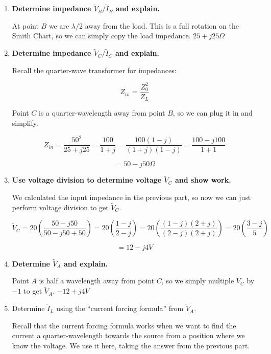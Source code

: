 \documentclass{article}
\begin{document}
\begin{enumerate}
    \item \textbf{Determine impedance $\tilde{V}_B/\tilde{I}_B$ and explain.}

    At point $B$ we are $\lambda/2$ away from the load. This is a full rotation on the Smith Chart, so we can simply copy the load impedance. $\boxed{25 + j25 \Omega}$

    \vfill
    
    \item \textbf{Determine impedance $\tilde{V}_C/\tilde{I}_C$ and explain.}

    Recall the quarter-wave transformer for impedances:

    $$Z_{in} = \frac{Z_0^2}{Z_L}$$

    Point $C$ is a quarter-wavelength away from point $B$, so we can plug it in and simplify.

    $$Z_{in} = \frac{50^2}{25 + j25} = \frac{100}{1 + j} = \frac{100(1 - j)}{(1 + j)(1 - j)} = \frac{100 - j100}{1 + 1}$$

    $$= \boxed{50 - j50 \Omega}$$

    \vfill
    
    \item \textbf{Use voltage division to determine voltage $\tilde{V}_C$ and show work.}

    We calculated the input impedance in the previous part, so now we can just perform voltage division to get $\tilde{V}_C$.

    $$\tilde{V}_C = 20 \left(\frac{50 - j50}{50 - j50 + 50} \right) = 20 \left(\frac{1 - j}{2 - j} \right) = 20 \left(\frac{(1 - j)(2 + j)}{(2 - j)(2 + j)} \right) = 20 \left(\frac{3 - j}{5} \right)$$

    $$= \boxed{12 - j4 V}$$

    \vfill
    \newpage
    
    \item \textbf{Determine $\tilde{V}_A$ and explain.}

    Point $A$ is half a wavelength away from point $C$, so we simply multiple $\tilde{V}_C$ by $-1$ to get $\tilde{V}_A$. $\boxed{-12 + j4 V}$

    \vfill
    
    \item Determine $\tilde{I}_L$ using the ``current forcing formula'' from $\tilde{V}_A$.

    Recall that the current forcing formula works when we want to find the current a quarter-wavelength towards the source from a position where we know the voltage. We use it here, taking the answer from the previous part.


\end{enumerate}
\end{document}
